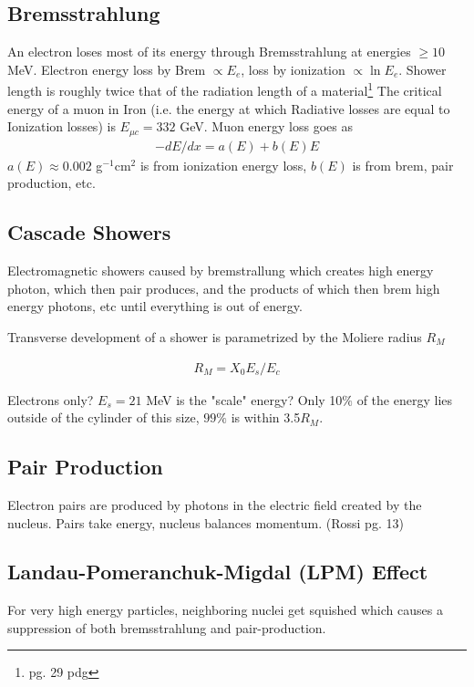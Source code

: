 \subsection{Bremsstrahlung}
 An electron loses most of its energy through Bremsstrahlung at energies $\ge 10$ MeV. Electron energy loss by Brem $\propto E_e$, loss by ionization $\propto \ln E_e$. Shower length is roughly twice that of the radiation length of a material\footnote{pg. 29 pdg} The critical energy of a muon in Iron (i.e. the energy at which Radiative losses are equal to Ionization losses) is $E_{\mu c} = 332$ GeV. Muon energy loss goes as 
 \begin{align}
 -dE/dx = a(E) + b(E)E
 \end{align}
 $a(E)\approx 0.002$ g$^{-1}$cm$^2$ is from ionization energy loss, $b(E)$ is from brem, pair production, etc.
\subsection{Cascade Showers}

Electromagnetic showers caused by bremstrallung which creates high energy photon, which then pair produces, and the products of which then brem high energy photons, etc until everything is out of energy.

Transverse development of a shower is parametrized by the Moliere radius $R_M$


\begin{align}
R_M = X_0E_s/E_c
\end{align}

Electrons only? $E_s = 21$ MeV is the "scale" energy? Only 10$\%$ of the energy lies outside of the cylinder of this size, $99\%$ is within 3.5$R_M$. 

\subsection{Pair Production}
Electron pairs are produced by photons in the electric field created by the nucleus. Pairs take energy, nucleus balances momentum. (Rossi pg. 13)

\subsection{Landau-Pomeranchuk-Migdal (LPM) Effect}
For very high energy particles, neighboring nuclei get squished which causes a suppression of both bremsstrahlung and pair-production.



